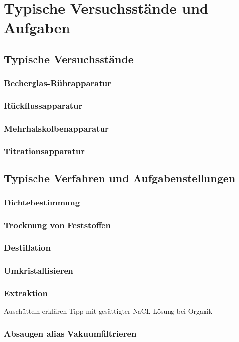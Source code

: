 \section{Typische Versuchsstände und Aufgaben}

\subsection{Typische Versuchsstände}
\subsubsection*{Becherglas-Rührapparatur}
\subsubsection*{Rückflussapparatur}
\subsubsection*{Mehrhalskolbenapparatur}
\subsubsection*{Titrationsapparatur}

\subsection{Typische Verfahren und Aufgabenstellungen}
\subsubsection*{Dichtebestimmung}
\subsubsection*{Trocknung von Feststoffen}
\subsubsection*{Destillation}
\subsubsection*{Umkristallisieren}
\subsubsection*{Extraktion}
\label{sec:extraktion}
Auschütteln erklären
Tipp mit gesättigter NaCL Lösung bei Organik
\subsubsection*{Absaugen alias Vakuumfiltrieren}
